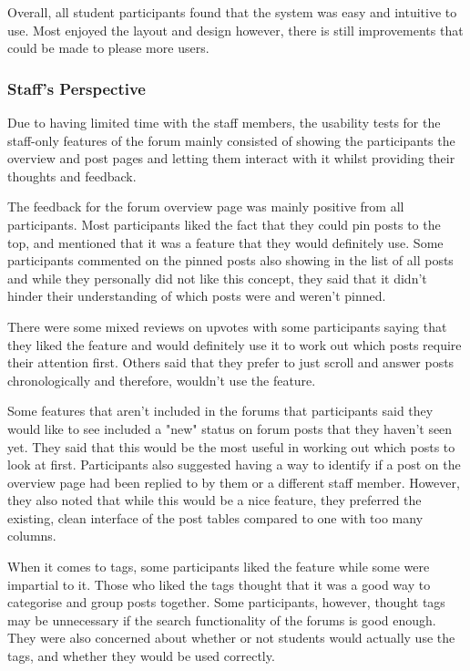 Overall, all student participants found that the system was easy and intuitive to use.
Most enjoyed the layout and design however, there is still improvements that could be made to please more users.

\subsubsection{Staff's Perspective}

Due to having limited time with the staff members, the usability tests for the staff-only features of the forum mainly consisted of showing the participants the overview and post pages and letting them interact with it whilst providing their thoughts and feedback.

The feedback for the forum overview page was mainly positive from all participants.
Most participants liked the fact that they could pin posts to the top, and mentioned that it was a feature that they would definitely use.
Some participants commented on the pinned posts also showing in the list of all posts and while they personally did not like this concept, they said that it didn't hinder their understanding of which posts were and weren't pinned.

There were some mixed reviews on upvotes with some participants saying that they liked the feature and would definitely use it to work out which posts require their attention first.
Others said that they prefer to just scroll and answer posts chronologically and therefore, wouldn't use the feature.

Some features that aren't included in the forums that participants said they would like to see included a "new" status on forum posts that they haven't seen yet.
They said that this would be the most useful in working out which posts to look at first.
Participants also suggested having a way to identify if a post on the overview page had been replied to by them or a different staff member.
However, they also noted that while this would be a nice feature, they preferred the existing, clean interface of the post tables compared to one with too many columns.

When it comes to tags, some participants liked the feature while some were impartial to it.
Those who liked the tags thought that it was a good way to categorise and group posts together.
Some participants, however, thought tags may be unnecessary if the search functionality of the forums is good enough.
They were also concerned about whether or not students would actually use the tags, and whether they would be used correctly.

